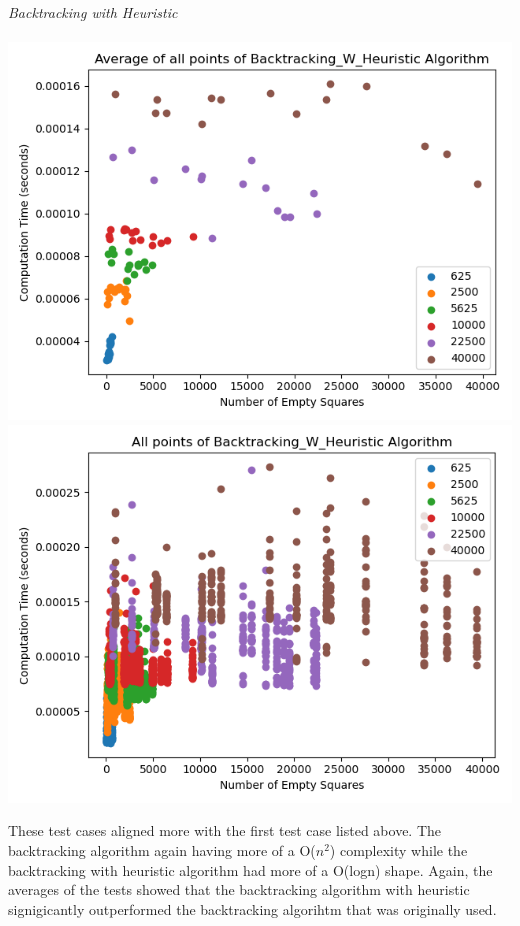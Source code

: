 \documentclass{article}
\begin{document}
\noindent \textit{Backtracking with Heuristic} \\ \\
\includegraphics[scale=0.5]{scatter_avg_Backtracking_w_Heuristic-3.png}
\includegraphics[scale=0.5]{scatter_Backtracking_w_Heuristic-3.png}

These test cases aligned more with the first test case listed above. The
backtracking algorithm again having more of a O($n^2$) complexity while the
backtracking with heuristic algorithm had more of a O(logn) shape. Again, 
the averages of the tests showed that the backtracking algorithm with heuristic
signigicantly outperformed the backtracking algorihtm that was originally used.
\end{document}
